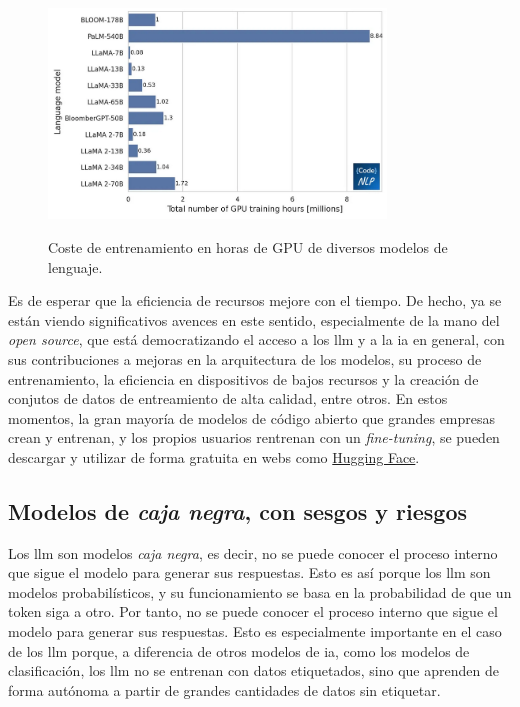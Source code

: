 \begin{figure}[H]
    \caption[Coste de entrenamiento en horas de GPU de diversos modelos de lenguaje]{Coste de entrenamiento en horas de GPU de diversos modelos de lenguaje.}
    \centering
    \includegraphics[width=0.8\textwidth]{./figuras/llm_gpu_training_hours.png}
    \label{fig:llm_gpu_training_hours}
  \end{figure}

Es de esperar que la eficiencia de recursos mejore con el tiempo. De hecho, ya se están viendo significativos avences en este sentido, especialmente de la mano del \emph{open source}, que está democratizando el acceso a los \gls{llm} y a la \gls{ia} en general, con sus contribuciones a mejoras en la arquitectura de los modelos, su proceso de entrenamiento, la eficiencia en dispositivos de bajos recursos y la creación de conjutos de datos de entreamiento de alta calidad, entre otros. En estos momentos, la gran mayoría de modelos de código abierto que grandes empresas crean y entrenan, y los propios usuarios rentrenan con un \emph{fine-tuning}, se pueden descargar y utilizar de forma gratuita en webs como \href{https://huggingface.co/}{Hugging Face}.


\subsection{Modelos de \emph{caja negra}, con sesgos y riesgos}

Los \gls{llm} son modelos \emph{caja negra}, es decir, no se puede conocer el proceso interno que sigue el modelo para generar sus respuestas. Esto es así porque los \gls{llm} son modelos probabilísticos, y su funcionamiento se basa en la probabilidad de que un token siga a otro. Por tanto, no se puede conocer el proceso interno que sigue el modelo para generar sus respuestas. Esto es especialmente importante en el caso de los \gls{llm} porque, a diferencia de otros modelos de \gls{ia}, como los modelos de clasificación, los \gls{llm} no se entrenan con datos etiquetados, sino que aprenden de forma autónoma a partir de grandes cantidades de datos sin etiquetar.

